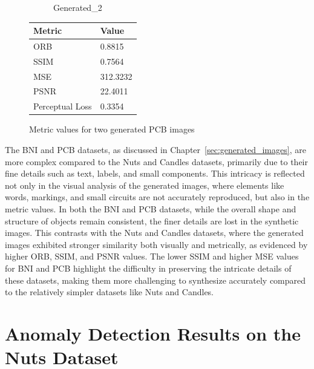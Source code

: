 \documentclass[12pt,DIV14,BCOR12mm,a4paper,footinclude=false,headinclude,parskip=half-,twoside,openright,cleardoublepage=empty,toc=index,bibliography=totoc,listof=totoc]{scrreprt}
\numberwithin{equation}{chapter}
\begin{document}
\begin{figure}
\begin{minipage}[H]{\linewidth}
\begin{minipage}[H]{0.5\linewidth}
\begin{subfigure}[t]{0.48\linewidth}
                \caption{Generated\_2}
            \end{subfigure}
        \end{minipage}%
        \hfill
        \begin{minipage}[H]{0.5\linewidth} %
            \centering
            \small
            \begin{tabular}{p{3cm} p{2cm}}
                \toprule
                \textbf{Metric} & \textbf{Value} \\
                \midrule
                ORB             & 0.8815        \\
                SSIM            & 0.7564        \\
                MSE             & 312.3232      \\
                PSNR            & 22.4011       \\
                Perceptual Loss & 0.3354        \\
                \bottomrule
            \end{tabular}
        \end{minipage}%
        \caption{Metric values for two generated PCB images}
        \label{fig:comparison_generated_1_1_generated_1_2_pcb}
    \end{minipage}
\end{figure}


The BNI and PCB datasets, as discussed in Chapter~\ref{sec:generated_images}, are more complex compared to the Nuts and Candles datasets, primarily due to their fine details such as text, labels, and small components. This intricacy is reflected not only in the visual analysis of the generated images, where elements like words, markings, and small circuits are not accurately reproduced, but also in the metric values. In both the BNI and PCB datasets, while the overall shape and structure of objects remain consistent, the finer details are lost in the synthetic images. This contrasts with the Nuts and Candles datasets, where the generated images exhibited stronger similarity both visually and metrically, as evidenced by higher ORB, SSIM, and PSNR values. The lower SSIM and higher MSE values for BNI and PCB highlight the difficulty in preserving the intricate details of these datasets, making them more challenging to synthesize accurately compared to the relatively simpler datasets like Nuts and Candles.

\section{Anomaly Detection Results on the Nuts Dataset}
\end{document}
